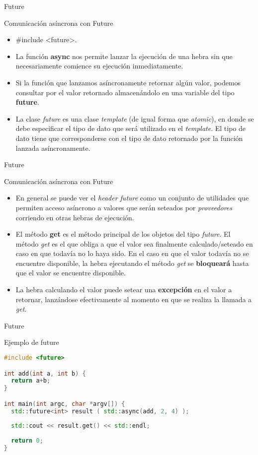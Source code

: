 \begin{frame}{Future}
\begin{block}{Comunicación asíncrona con Future}
\begin{itemize}
  \item \#include \textless future\textgreater .
  \item La función \textbf{async} nos permite lanzar la ejecución de una hebra sin que necesariamente comience su ejecución inmediatamente.
  \item Si la función que lanzamos asíncronamente retornar algún valor, podemos consultar por el valor retornado almacenándolo en una variable del tipo \textbf{future}.
  \item La clase \textit{future} es una clase \textit{template} (de igual forma que \textit{atomic}), en donde se debe especificar el tipo de dato que será utilizado en el \textit{template}. El tipo de dato tiene que corresponderse con el tipo de dato retornado por la función lanzada asíncronamente.
\end{itemize}
\end{block}
\end{frame}

\begin{frame}{Future}
\begin{block}{Comunicación asíncrona con Future}
\begin{itemize}
  \item En general se puede ver el \textit{header future} como un conjunto de utilidades que permiten acceso asíncrono a valores que serán seteados por \textit{proveedores} corriendo en otras hebras de ejecución.
  \item El método \textbf{get} es el método principal de los objetos del tipo \textit{future}. El método \textit{get} es el que obliga a que el valor sea finalmente calculado/seteado en caso en que todavía no lo haya sido. En el caso en que el valor todavía no se encuentre disponible, la hebra ejecutando el método \textit{get} se \textbf{bloqueará} hasta que el valor se encuentre disponible.
  \item La hebra calculando el valor puede setear una \textbf{excepción} en el valor a retornar, lanzándose efectivamente al momento en que se realiza la llamada a \textit{get}.
\end{itemize}
\end{block}
\end{frame}

\begin{frame}[fragile]{Future}
\begin{block}{Ejemplo de future}
\begin{lstlisting}[language=C++, basicstyle=\small]
#include <future>

int add(int a, int b) {
  return a+b;
}

int main(int argc, char *argv[]) {
  std::future<int> result ( std::async(add, 2, 4) );
  
  std::cout << result.get() << std::endl;
  
  return 0;
}
\end{lstlisting}
\end{block}
\end{frame}

